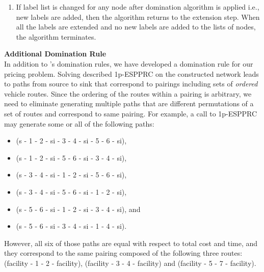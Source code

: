 \begin{enumerate}
\begin{enumerate}

    All dominated labels are deleted from the label lists of the nodes. 
  \item If label list is changed for any node after domination algorithm 
    is applied i.e., new labels are added, then the algorithm returns 
    to the extension step. When all the labels are extended and no new 
    labels are added to the lists of nodes, the algorithm terminates. 
  \end{enumerate}
\end{enumerate}

{\bf Additional Domination Rule}\\
In addition to \citet{Feillet}'s domination rules, we have developed
a domination rule for our pricing problem. Solving described 1p-ESPPRC on the 
constructed network leads to paths from source to sink that correspond 
to pairings including sets of {\em ordered} vehicle routes.  
Since the ordering of the routes within a pairing is arbitrary, 
we need to eliminate generating multiple paths that are
different permutations of a set of routes and correspond to same
pairing.  
For example, a call to 1p-ESPPRC may generate some or all of 
the following paths:
\begin{itemize}  
\item (s - 1 - 2 - si - 3 - 4 - si - 5 - 6 - si), 
\item (s - 1 - 2 - si - 5 - 6 - si - 3 - 4 - si),
\item (s - 3 - 4 - si - 1 - 2 - si - 5 - 6 - si), 
\item (s - 3 - 4 - si - 5 - 6 - si - 1 - 2 - si), 
\item (s - 5 - 6 - si - 1 - 2 - si - 3 - 4 - si), and
\item (s - 5 - 6 - si - 3 - 4 - si - 1 - 4 - si). 
\end{itemize}
However, all six 
of those paths are equal with respect to total cost and time, and they 
correspond to the same pairing composed of the following three 
routes: (facility - 1 - 2 - facility), (facility - 3 - 4 - facility) and 
(facility - 5 - 7 - facility). 
